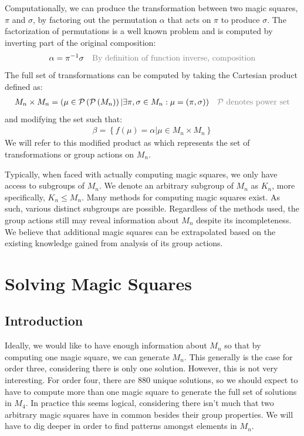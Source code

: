 \documentclass[12pt]{report}
\def\light#1{{\color{light}#1}}
\begin{document}
\par Computationally, we can produce the transformation between two magic squares, $\pi$ and
$\sigma$, by factoring out the permutation $\alpha$ that acts on $\pi$ to produce $\sigma$. The
factorization of permutations is a well known problem and is computed by inverting part of the
original composition:
\begin{align}
  \alpha=\pi^{-1}\sigma &  & \text{\light{By definition of function inverse, composition}}
\end{align}
The full set of transformations can be computed by taking the Cartesian product defined as:
\begin{align}
  M_n \times M_n = \left(\mu \in \mathcal{P}\left(\mathcal{P}\left(M_n\right)\right)\vert
  \exists\pi,\sigma\in M_n : \mu = (\pi,\sigma)\right) &  & \text{\light{$\mathcal{P}$ denotes
      power
      set}}
\end{align}
and modifying the set such that:
\begin{align}
  \beta = \left\{f(\mu)=\alpha\vert\mu\in M_n \times M_n\right\}
\end{align}
We will refer to this modified product as  which represents the set of transformations or group
actions on $M_n$.

\par Typically, when faced with actually computing magic squares, we only have access to subgroups
of $M_n$. We denote an arbitrary subgroup of $M_n$ as $K_n$, more specifically, $K_n \leq M_n$.
Many methods for computing magic squares exist. As such, various distinct subgroups are possible.
Regardless of the methods used, the group actions still may reveal information about $M_n$ despite
its incompleteness. We believe that additional magic squares can be extrapolated based on the
existing knowledge gained from analysis of its group actions.

\chapter{Solving Magic Squares}

\section{Introduction}

\par Ideally, we would like to have enough information about $M_n$ so that by computing one magic
square, we can generate $M_n$. This generally is the case for order three, considering there is
only one solution. However, this is not very interesting. For order four, there are 880 unique
solutions, so we should expect to have to compute more than one magic square to generate the full
set of solutions in $M_4$. In practice this seems logical, considering there isn't much that two
arbitrary magic squares have in common besides their group properties. We will have to dig deeper
in order to find patterns amongst elements in $M_n$.
\end{document}
